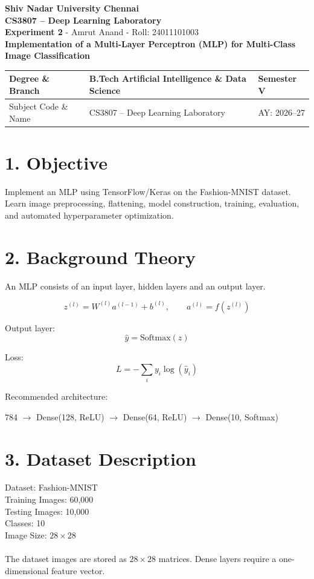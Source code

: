 \documentclass[11pt]{article}
\begin{document}
\begin{center}
{\Large\textbf{Shiv Nadar University Chennai}}\\
\textbf{CS3807 -- Deep Learning Laboratory}\\
\textbf{Experiment 2} - Amrut Anand - Roll: 24011101003\\
{\large\vspace{0.2cm}\textbf{Implementation of a Multi-Layer Perceptron (MLP) for Multi-Class Image Classification}}
\end{center}

\renewcommand{\arraystretch}{1.25}

\begin{tabular}{|p{3.8cm}|p{8cm}|p{2cm}|}
\hline
Degree \& Branch & B.Tech Artificial Intelligence \& Data Science & Semester V\\ \hline
Subject Code \& Name & CS3807 -- Deep Learning Laboratory & AY: 2026--27\\ \hline
\end{tabular}

\section*{1. Objective}
Implement an MLP using TensorFlow/Keras on the Fashion-MNIST dataset. Learn image preprocessing, flattening, model construction, training, evaluation, and automated hyperparameter optimization.


\section*{2. Background Theory}
An MLP consists of an input layer, hidden layers and an output layer.

\[
z^{(l)}=W^{(l)}a^{(l-1)}+b^{(l)},\qquad
a^{(l)}=f(z^{(l)})
\]

Output layer:
\[
\hat y=\mathrm{Softmax}(z)
\]

Loss:
\[
L=-\sum_i y_i\log(\hat y_i)
\]

Recommended architecture:

\begin{center}
784 $\rightarrow$ Dense(128, ReLU) $\rightarrow$ Dense(64, ReLU) $\rightarrow$ Dense(10, Softmax)
\end{center}

\section*{3. Dataset Description}
Dataset: Fashion-MNIST \\
Training Images: 60,000 \\
Testing Images: 10,000 \\
Classes: 10 \\
Image Size: $28\times28$ \\
\vspace{0.1mm} \\
The dataset images are stored as $28\times28$ matrices. Dense layers require a one-dimensional feature vector.
\end{document}
